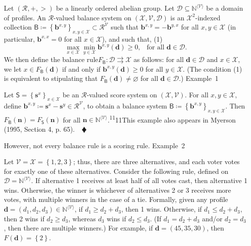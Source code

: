 \documentclass[
]{article}
\begin{document}
Let \(\left( \mathcal{R}, + , > \right)\) be a linearly ordered abelian
group. Let
\(\mathcal{D} \subseteq \mathbb{N}^{\langle\mathcal{V}\rangle}\) be a
domain of profiles. An \(\mathcal{R}\)-valued balance system on
\(\left( \mathcal{X},\mathcal{V},\mathcal{D} \right)\) is an
\(\mathcal{X}^{2}\)-indexed collection
\(\mathsf{B} ≔ \left\{ \mathbf{b}^{x,y} \right\}_{x,y \in \mathcal{X}} \subset \mathcal{R}^{\mathcal{V}}\)
such that \(\mathbf{b}^{x,y} = - \mathbf{b}^{y,x}\) for all
\(x,y \in \mathcal{X}\) (in particular, \(\mathbf{b}^{x,x} = 0\) for all
\(x \in \mathcal{X}\)), and such that,
(1)\[\max\limits_{x \in \mathcal{X}}\min\limits_{y \in \mathcal{X}}\mathbf{b}^{x,y}\left( \mathbf{d} \right) \geq 0\text{,}\quad\text{for~all~}\mathbf{d} \in \mathcal{D}\text{.}\]
We then define the balance
rule\(\left. F_{\mathsf{B}}:\mathcal{D}\rightrightarrows\mathcal{X} \right.\)
as follows: for all \(\mathbf{d} \in \mathcal{D}\) and
\(x \in \mathcal{X}\), we let
\(x \in F_{\mathsf{B}}\left( \mathbf{d} \right)\) if and only if
\(\mathbf{b}^{x,y}\left( \mathbf{d} \right) \geq 0\) for all
\(y \in \mathcal{X}\). (The condition (1) is equivalent to stipulating
that
\(F_{\mathsf{B}}\left( \mathbf{d} \right) \neq \varnothing\)
for all \(\mathbf{d} \in \mathcal{D}\).) Example~1

Let \(\mathsf{S} = \left\{ \mathbf{s}^{x} \right\}_{x \in \mathcal{X}}\)
be an \(\mathcal{R}\)-valued score system on
\(\left( \mathcal{X},\mathcal{V} \right)\). For all
\(x,y \in \mathcal{X}\), define
\(\mathbf{b}^{x,y} ≔ \mathbf{s}^{x} - \mathbf{s}^{y} \in \mathcal{R}^{\mathcal{V}}\),
to obtain a balance system
\(\mathsf{B} ≔ \left\{ \mathbf{b}^{x,y} \right\}_{x,y \in \mathcal{X}}\).
Then
\(F_{\mathsf{B}}\left( \mathbf{n} \right) = F_{\mathsf{S}}\left( \mathbf{n} \right)\)
for all
\(\mathbf{n} \in \mathbb{N}^{\langle\mathcal{V}\rangle}\).\textsuperscript{11}11This
example also appears in Myerson (1995, Section 4, p. 65).\(\quad ♦\)

However, not every balance rule is a scoring rule. Example~2

Let \(\mathcal{V} = \mathcal{X} = \left\{ 1,2,3 \right\}\); thus, there
are three alternatives, and each voter votes for exactly one of these
alternatives. Consider the following rule, defined on
\(\mathcal{D} = \mathbb{N}^{\langle\mathcal{V}\rangle}\). If alternative
1 receives at least half of all votes cast, then alternative 1 wins.
Otherwise, the winner is whichever of alternatives 2 or 3 receives more
votes, with multiple winners in the case of a tie. Formally, given any
profile
\(\mathbf{d} = \left( d_{1},d_{2},d_{3} \right) \in \mathbb{N}^{\langle\mathcal{V}\rangle}\),
if \(d_{1} \geq d_{2} + d_{3}\), then 1 wins. Otherwise, if
\(d_{1} \leq d_{2} + d_{3}\), then 2 wins if \(d_{2} \geq d_{3}\),
whereas \(d_{3}\) wins if \(d_{2} \leq d_{3}\). (If
\(d_{1} = d_{2} + d_{3}\) and/or \(d_{2} = d_{3}\), then there are
multiple winners.) For example, if \(\mathbf{d} = (45,35,30)\), then
\(F\left( \mathbf{d} \right) = \left\{ 2 \right\}\).
\end{document}
